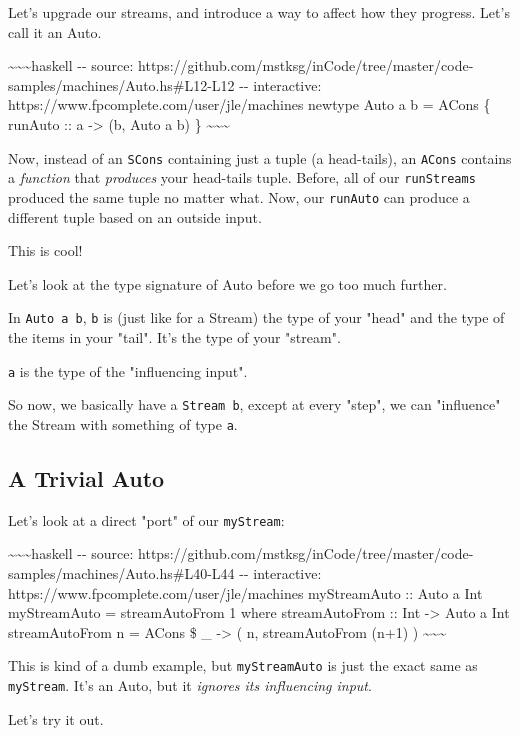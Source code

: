 \documentclass[]{article}
\begin{document}
Let's upgrade our streams, and introduce a way to affect how they progress.
Let's call it an Auto.

\textasciitilde{}\textasciitilde{}\textasciitilde{}haskell -\/- source:
https://github.com/mstksg/inCode/tree/master/code-samples/machines/Auto.hs\#L12-L12
-\/- interactive: https://www.fpcomplete.com/user/jle/machines newtype Auto a b
= ACons \{ runAuto :: a -\textgreater{} (b, Auto a b) \}
\textasciitilde{}\textasciitilde{}\textasciitilde{}

Now, instead of an \texttt{SCons} containing just a tuple (a head-tails), an
\texttt{ACons} contains a \emph{function} that \emph{produces} your head-tails
tuple. Before, all of our \texttt{runStreams} produced the same tuple no matter
what. Now, our \texttt{runAuto} can produce a different tuple based on an
outside input.

This is cool!

Let's look at the type signature of Auto before we go too much further.

In \texttt{Auto\ a\ b}, \texttt{b} is (just like for a Stream) the type of your
"head" and the type of the items in your "tail". It's the type of your "stream".

\texttt{a} is the type of the "influencing input".

So now, we basically have a \texttt{Stream\ b}, except at every "step", we can
"influence" the Stream with something of type \texttt{a}.

\subsection{A Trivial Auto}

Let's look at a direct "port" of our \texttt{myStream}:

\textasciitilde{}\textasciitilde{}\textasciitilde{}haskell -\/- source:
https://github.com/mstksg/inCode/tree/master/code-samples/machines/Auto.hs\#L40-L44
-\/- interactive: https://www.fpcomplete.com/user/jle/machines myStreamAuto ::
Auto a Int myStreamAuto = streamAutoFrom 1 where streamAutoFrom :: Int
-\textgreater{} Auto a Int streamAutoFrom n = ACons \$ \_ -\textgreater{} ( n,
streamAutoFrom (n+1) ) \textasciitilde{}\textasciitilde{}\textasciitilde{}

This is kind of a dumb example, but \texttt{myStreamAuto} is just the exact same
as \texttt{myStream}. It's an Auto, but it \emph{ignores its influencing input}.

Let's try it out.
\end{document}
